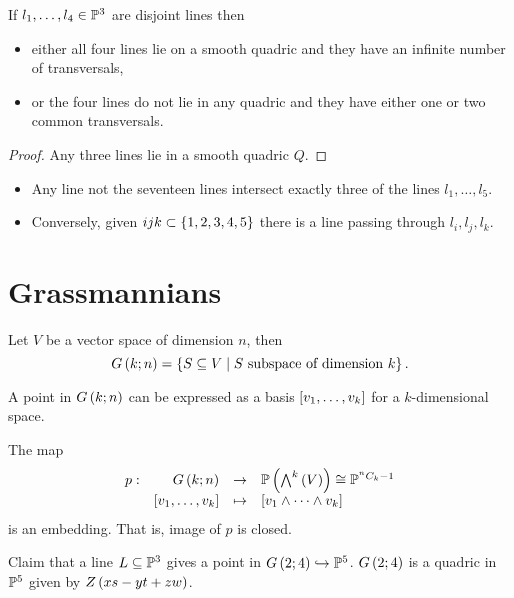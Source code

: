 \begin{lemma}
If $ l_1, \dots, l_4 \in \P^3 $ are disjoint lines then
\begin{itemize}
\item either all four lines lie on a smooth quadric and they have an infinite number of transversals,
\item or the four lines do not lie in any quadric and they have either one or two common transversals.
\end{itemize}
\end{lemma}

\begin{proof}
Any three lines lie in a smooth quadric $ Q $.
\end{proof}

\begin{lemma}
\hfill
\begin{itemize}
\item Any line not the seventeen lines intersect exactly three of the lines $ l_1, \dots, l_5 $.
\item Conversely, given $ ijk \subset \cb{1, 2, 3, 4, 5} $ there is a line passing through $ l_i, l_j, l_k $.
\end{itemize}
\end{lemma}

\pagebreak

\section{Grassmannians}


\begin{definition}
Let $ V $ be a vector space of dimension $ n $, then
$$ G\rb{k; n} = \cb{S \subseteq V \mid S \ \text{subspace of dimension} \ k}. $$
\end{definition}

\begin{remark}
A point in $ G\rb{k; n} $ can be expressed as a basis $ \sb{v_1, \dots, v_k} $ for a $ k $-dimensional space.
\end{remark}

\begin{theorem}
The map
$$ \function[p]{G\rb{k; n}}{\P\rb{\bigwedge^k\rb{V}} \cong \P^{^nC_k - 1}}{\sb{v_1, \dots, v_k}}{\sb{v_1 \wedge \dots \wedge v_k}} $$
is an embedding. That is, image of $ p $ is closed.
\end{theorem}

\begin{example}
Claim that a line $ L \subseteq \P^3 $ gives a point in $ G\rb{2; 4} \hookrightarrow \P^5 $. $ G\rb{2; 4} $ is a quadric in $ \P^5 $ given by $ Z\rb{xs - yt + zw} $.
\end{example}


